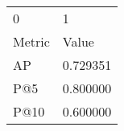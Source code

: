 \begin{tabular}{ll}
0 & 1 \\
Metric & Value \\
AP & 0.729351 \\
P@5 & 0.800000 \\
P@10 & 0.600000 \\
\end{tabular}
